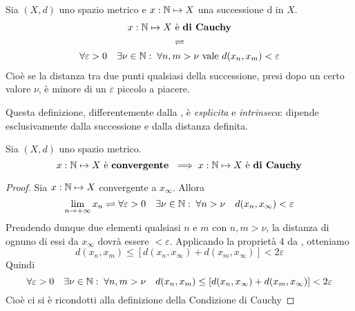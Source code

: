 \begin{definition}
	\label{def:cond_cau}
	Sia $(X,d)$ uno spazio metrico e $x: \mathbb{N} \mapsto X$ una successione d in $X$.
	\begin{equation*}
		\begin{gathered}
			x:\mathbb{N} \mapsto X \text{ è \textbf{di Cauchy}}\\
			\rightleftharpoons\\
			\forall \varepsilon > 0\quad \exists \nu \in \mathbb{N}:\; \forall n,m > \nu \text{ vale } d(x_n, x_m) < \varepsilon
		\end{gathered}
	\end{equation*}
	Cioè se la distanza tra due punti qualsiasi della successione, presi dopo un certo valore $\nu$, è minore di un $\varepsilon$ piccolo a piacere.
	\begin{note}
		Questa definizione, differentemente dalla , è \textit{esplicita} e \textit{intrinseca}: dipende esclusivamente dalla successione e dalla distanza definita.
	\end{note}
\end{definition}
\begin{proposition}
	\label{prop:se_succ_conv_allora_cau}
	Sia $(X,d)$ uno spazio metrico.
	\[x: \mathbb{N} \mapsto X \text{ è \textbf{convergente} } \implies x:\mathbb{N} \mapsto X \text{ è \textbf{di Cauchy}}\]
	\begin{proof}
		Sia $x: \mathbb{N} \mapsto X$ convergente a $x_\infty$. Allora
		\[\lim\limits_{n \to +\infty} x_n \rightleftharpoons \forall\varepsilon > 0 \quad \exists\nu\in\mathbb{N}:\; \forall n > \nu \quad d(x_n,x_\infty)<\varepsilon\]
		Prendendo dunque due elementi qualsiasi $n$ e $m$ con $n,m > \nu$, la distanza di ognuno di essi da $x_\infty$ dovrà essere $<\varepsilon$. Applicando la proprietà 4 da , otteniamo
		\[d(x_n,x_m) \leq \left[ d(x_n,x_\infty)+d(x_m,x_\infty) \right] < 2\varepsilon\]
		Quindi
		\[\forall\varepsilon > 0 \quad \exists\nu\in\mathbb{N}:\; \forall n,m > \nu \quad d(x_n,x_m) \leq \left[ d(x_n,x_\infty)+d(x_m,x_\infty) \right] < 2\varepsilon\]
		Cioè ci si è ricondotti alla definizione della Condizione di Cauchy
	\end{proof}
\end{proposition}

